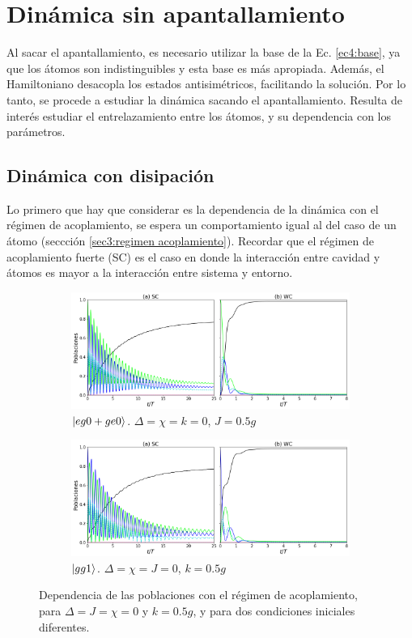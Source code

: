 \section{Dinámica sin apantallamiento}
\label{sec4:dinamica sin apantallamiento}

Al sacar el apantallamiento, es necesario utilizar la base de la Ec. \ref{ec4:base}, ya que los átomos son indistinguibles y esta base es más apropiada. Además, el Hamiltoniano desacopla los estados antisimétricos, facilitando la solución. Por lo tanto, se procede a estudiar la dinámica sacando el apantallamiento. Resulta de interés estudiar el entrelazamiento entre los átomos, y su dependencia con los parámetros. 

\subsection{Dinámica con disipación}
Lo primero que hay que considerar es la dependencia de la dinámica con el régimen de acoplamiento, se espera un comportamiento igual al del caso de un átomo (seccción \ref{sec3:regimen acoplamiento}). Recordar que el régimen de acoplamiento fuerte (SC) es el caso en donde la interacción entre cavidad y átomos es mayor a la interacción entre sistema y entorno.
\begin{figure}[h]
    \centering
    \begin{subfigure}{0.7\textwidth}
        \includegraphics[width=\textwidth]{figuras/ch4/sc vs wc eg0 sim j0.5.png}
        \caption{$\ket{eg0+ge0}$. $\Delta=\chi=k=0$, $J=0.5g$}
        \label{fig4:acoplamiento eg0 sim}
    \end{subfigure}
    \vfill
    \begin{subfigure}{0.7\textwidth}
        \includegraphics[width=\textwidth]{figuras/ch4/sc vs wc gg1 k=0.5.png}
        \caption{$\ket{gg1}$. $\Delta=\chi=J=0$, $k=0.5g$ }
        \label{fig4:acoplamiento gg1}
    \end{subfigure}
    \caption{Dependencia de las poblaciones con el régimen de acoplamiento, para $\Delta=J=\chi=0$ y $k=0.5g$, y para dos condiciones iniciales diferentes.}
    \label{fig4:regimen acoplamiento}
\end{figure}
